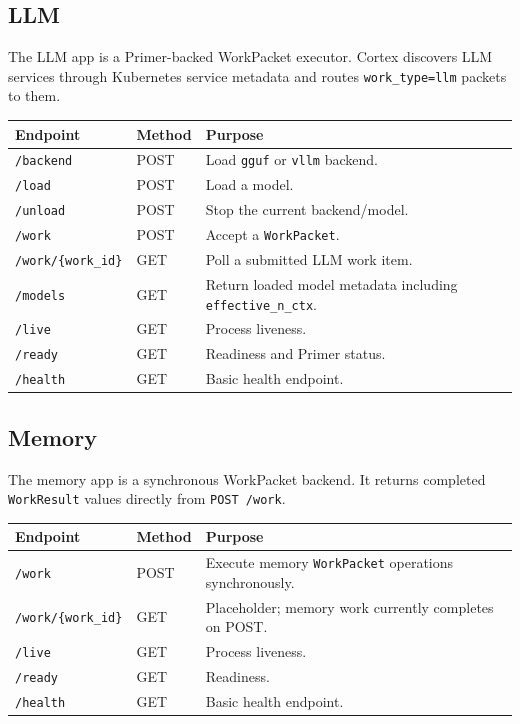 \documentclass[11pt,a4paper]{article}
\begin{document}
\subsection{LLM}
The LLM app is a Primer-backed WorkPacket executor. Cortex discovers LLM services through Kubernetes service metadata and routes \texttt{work\_type=llm} packets to them.

\begin{longtable}{@{}p{4cm}p{2cm}p{8cm}@{}}
\toprule
\textbf{Endpoint} & \textbf{Method} & \textbf{Purpose} \\
\midrule
\endhead
\texttt{/backend} & POST & Load \texttt{gguf} or \texttt{vllm} backend. \\
\texttt{/load} & POST & Load a model. \\
\texttt{/unload} & POST & Stop the current backend/model. \\
\texttt{/work} & POST & Accept a \texttt{WorkPacket}. \\
\texttt{/work/\{work\_id\}} & GET & Poll a submitted LLM work item. \\
\texttt{/models} & GET & Return loaded model metadata including \texttt{effective\_n\_ctx}. \\
\texttt{/live} & GET & Process liveness. \\
\texttt{/ready} & GET & Readiness and Primer status. \\
\texttt{/health} & GET & Basic health endpoint. \\
\bottomrule
\end{longtable}

\subsection{Memory}
The memory app is a synchronous WorkPacket backend. It returns completed \texttt{WorkResult} values directly from \texttt{POST /work}.

\begin{longtable}{@{}p{4cm}p{2cm}p{8cm}@{}}
\toprule
\textbf{Endpoint} & \textbf{Method} & \textbf{Purpose} \\
\midrule
\endhead
\texttt{/work} & POST & Execute memory \texttt{WorkPacket} operations synchronously. \\
\texttt{/work/\{work\_id\}} & GET & Placeholder; memory work currently completes on POST. \\
\texttt{/live} & GET & Process liveness. \\
\texttt{/ready} & GET & Readiness. \\
\texttt{/health} & GET & Basic health endpoint. \\
\bottomrule
\end{longtable}
\end{document}
